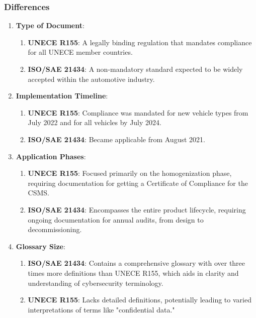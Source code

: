 \subsubsection{Differences}

\begin{enumerate}
    \item \textbf{Type of Document}:
    \begin{enumerate}
        \item \textbf{UNECE R155}: A legally binding regulation that mandates compliance for all UNECE member countries.
        \item \textbf{ISO/SAE 21434}: A non-mandatory standard expected to be widely accepted within the automotive industry.
    \end{enumerate}

    \item \textbf{Implementation Timeline}:
    \begin{enumerate}
        \item \textbf{UNECE R155}: Compliance was mandated for new vehicle types from July 2022 and for all vehicles by July 2024.
        \item \textbf{ISO/SAE 21434}: Became applicable from August 2021.
    \end{enumerate}

    \item \textbf{Application Phases}:
    \begin{enumerate}
        \item \textbf{UNECE R155}: Focused primarily on the homogenization phase, requiring documentation for getting a Certificate of Compliance for the CSMS.
        \item \textbf{ISO/SAE 21434}: Encompasses the entire product lifecycle, requiring ongoing documentation for annual audits, from design to decommissioning.
    \end{enumerate}

    \item \textbf{Glossary Size}:
    \begin{enumerate}
        \item \textbf{ISO/SAE 21434}: Contains a comprehensive glossary with over three times more definitions than UNECE R155, which aids in clarity and understanding of cybersecurity terminology.
        \item \textbf{UNECE R155}: Lacks detailed definitions, potentially leading to varied interpretations of terms like "confidential data."
    \end{enumerate}


\end{enumerate}
